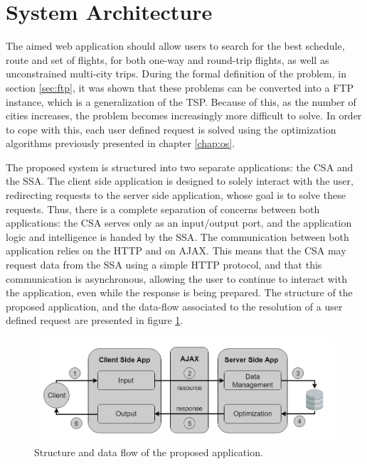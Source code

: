 \section{System Architecture}
\label{sec:system_architecture}

The aimed web application should allow users to search for the best schedule, route and set of flights, for both one-way and round-trip flights, as well as unconstrained multi-city trips. During the formal definition of the problem, in section \ref{sec:ftp}, it was shown that these problems can be converted into a FTP instance, which is a generalization of the TSP. Because of this, as the number of cities increases, the problem becomes increasingly more difficult to solve. In order to cope with this, each user defined request is solved using the optimization algorithms previously presented in chapter \ref{chap:os}.

The proposed system is structured into two separate applications: the \ac{CSA} and the \ac{SSA}. The client side application is designed to solely interact with the user, redirecting  requests to the server side application, whose goal is to solve these requests. Thus, there is a complete separation of concerns between both applications: the CSA serves only as an input/output port, and the application logic and intelligence is handed by the SSA. The communication between both application relies on the \ac{HTTP} and on \ac{AJAX}. This means that the CSA may request data from the SSA using a simple HTTP protocol, and that this communication is asynchronous, allowing the user to continue to interact with the application, even while the response is being prepared. The structure of the proposed application, and the data-flow associated to the resolution of a user defined request are presented in figure \ref{fig:sa_design}.

\begin{figure}[htpb]
  \centering
  \includegraphics[width=\textwidth]{./Figures/system_design/system_architecture_design.png}
	\caption{Structure and data flow of the proposed application.}
  \label{fig:sa_design}  
\end{figure}

